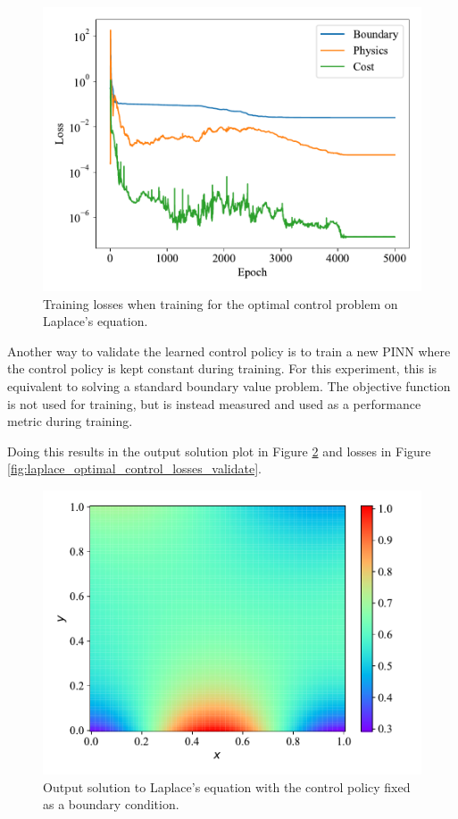 \begin{figure}[H]
    \centering
    \includegraphics[width=1.0\linewidth]{Figures/IntermediateExperiments/OptimalControl/laplace_optimal_control_losses.pdf}
    \caption{Training losses when training for the optimal control problem on Laplace's equation.}
    \label{fig:laplace_optimal_control_losses}
\end{figure}

Another way to validate the learned control policy is to train a new PINN where the control policy is kept constant during training. For this experiment, this is equivalent to solving a standard boundary value problem. The objective function is not used for training, but is instead measured and used as a performance metric during training.

Doing this results in the output solution plot in Figure \ref{fig:laplace_optimal_control_validate} and losses in Figure \ref{fig:laplace_optimal_control_losses_validate}.

\begin{figure}[H]
    \centering
    \includegraphics[width=1.0\linewidth]{Figures/IntermediateExperiments/OptimalControl/laplace_optimal_control_validate.pdf}
    \caption{Output solution to Laplace's equation with the control policy fixed as a boundary condition.}
    \label{fig:laplace_optimal_control_validate}
\end{figure}

